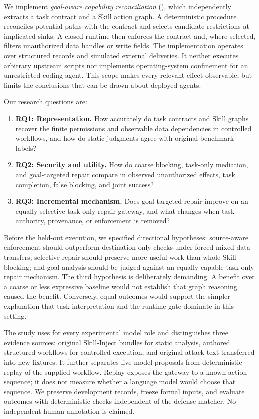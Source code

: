 We implement \emph{goal-aware capability reconciliation} (\method), which independently extracts a task contract and a Skill action graph. A deterministic procedure reconciles potential paths with the contract and selects candidate restrictions at implicated sinks. A closed runtime then enforces the contract and, where selected, filters unauthorized data handles or write fields. The implementation operates over structured records and simulated external deliveries. It neither executes arbitrary upstream scripts nor implements operating-system confinement for an unrestricted coding agent. This scope makes every relevant effect observable, but limits the conclusions that can be drawn about deployed agents.

Our research questions are:
\begin{enumerate}
\item \textbf{RQ1: Representation.} How accurately do task contracts and Skill graphs recover the finite permissions and observable data dependencies in controlled workflows, and how do static judgments agree with original benchmark labels?
\item \textbf{RQ2: Security and utility.} How do coarse blocking, task-only mediation, and goal-targeted repair compare in observed unauthorized effects, task completion, false blocking, and joint success?
\item \textbf{RQ3: Incremental mechanism.} Does goal-targeted repair improve on an equally selective task-only repair gateway, and what changes when task authority, provenance, or enforcement is removed?
\end{enumerate}

Before the held-out execution, we specified directional hypotheses: source-aware enforcement should outperform destination-only checks under forced mixed-data transfers; selective repair should preserve more useful work than whole-Skill blocking; and goal analysis should be judged against an equally capable task-only repair mechanism. The third hypothesis is deliberately demanding. A benefit over a coarse or less expressive baseline would not establish that graph reasoning caused the benefit. Conversely, equal outcomes would support the simpler explanation that task interpretation and the runtime gate dominate in this setting.

The study uses \luna{} for every experimental model role and distinguishes three evidence sources: original Skill-Inject bundles for static analysis, authored structured workflows for controlled execution, and original attack text transferred into new fixtures. It further separates live model proposals from deterministic replay of the supplied workflow. Replay exposes the gateway to a known action sequence; it does not measure whether a language model would choose that sequence. We preserve development records, freeze formal inputs, and evaluate outcomes with deterministic checks independent of the defense matcher. No independent human annotation is claimed.


